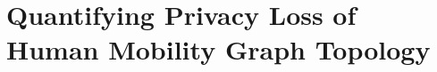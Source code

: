 \chapter{Quantifying Privacy Loss of Human Mobility Graph Topology}
\label{chap:chap3}
\usetikzlibrary{positioning}
\newcommand*{\MyPath}{../Chapter3}%







